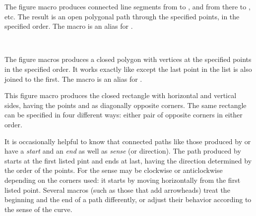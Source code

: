 \documentclass[letterpaper]{article}
\begin{document}
The figure macro  produces connected line segments from
 to , and from there to , etc. The
result is an open polygonal path through the specified points, in the
specified order. The macro  is an alias for .

\begin{cd}
\\
%
%
\end{cd}

The figure macros  produces a closed polygon with vertices
at the specified points in the specified order. It works exactly like
 except the last point in the list is also joined to the
first. The macro  is an alias for .

\begin{cd}
%
\end{cd}

This figure macro produces the closed rectangle with horizontal and
vertical sides, having the points  and  as
diagonally opposite corners. The same rectangle can be specified in four
different ways: either pair of opposite corners in either order.

It is occasionally helpful to know that connected paths like those
produced by  or  have a \emph{start} and an
\emph{end} as well as \emph{sense} (or direction). The path produced by
 starts at the first listed pint and ends at last, having
the direction determined by the order of the points. For  the
sense may be clockwise or anticlockwise depending on the corners used:
it starts by moving horizontally from the first listed point.
Several \mfp{} macros (such as those that add arrowheads) treat the
beginning and the end of a path differently, or adjust their behavior
according to the sense of the curve.

\begin{cd}
%
\end{cd}
\end{document}
